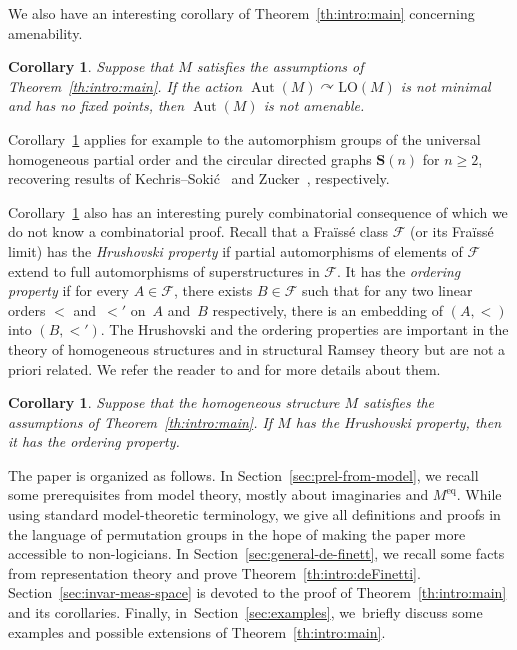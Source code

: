 \documentclass[11pt]{article}
\let\mathcal\mathscr
\let\actson\curvearrowright
\theoremstyle{plain}
\newtheorem{cor}[theorem]{Corollary}
\theoremstyle{definition}
\newcommand{\bS}{{\mathbf S}}
\newcommand{\cF}{\mathcal{F}}
\DeclareMathOperator{\Aut}{Aut}
\newcommand{\LO}{\mathrm{LO}}
\newcommand{\eq}{^{\mathrm{eq}}}
\begin{document}
We also have an interesting corollary of Theorem~\ref{th:intro:main} concerning amenability.
\begin{cor}
\label{c:intro:amenability}
Suppose that $M$ satisfies the assumptions of Theorem~\ref{th:intro:main}. If the action $\Aut(M) \actson \LO(M)$ is not minimal and has no fixed points, then $\Aut(M)$ is not amenable.
\end{cor}

Corollary~\ref{c:intro:amenability} applies for example to the automorphism groups of the universal homogeneous partial order and the circular directed graphs $\bS(n)$ for $n \geq 2$, recovering results of Kechris--Soki\'c~\cite{Kechris2012} and Zucker~\cite{Zucker2014}, respectively.

Corollary~\ref{c:intro:amenability} also has an interesting purely combinatorial consequence of which we do not know a combinatorial proof. Recall that a Fraïssé class $\cF$ (or its Fraïssé limit) has the \emph{Hrushovski property} if partial automorphisms of elements of $\cF$ extend to full automorphisms of superstructures in $\cF$. It has the \emph{ordering property} if for every $A \in \cF$, there exists $B \in \cF$ such that for any two linear orders $<$ and~$<'$ on~$A$ and~$B$ respectively, there is an embedding of $(A, <)$ into $(B, <')$. The Hrushovski and the ordering properties are important in the theory of homogeneous structures and in structural Ramsey theory but are not a priori related. We refer the reader to \cite{Kechris2007a} and \cite{Nesetril1978} for more details about them.
\begin{cor}
\label{c:intro:Hrushovski}
Suppose that the homogeneous structure $M$ satisfies the assumptions of Theorem~\ref{th:intro:main}. If $M$ has the Hrushovski property, then it has the ordering property.
\end{cor}

The paper is organized as follows. In Section~\ref{sec:prel-from-model}, we recall some prerequisites from model theory, mostly about imaginaries and $M\eq$. While using standard model-theoretic terminology, we give all definitions and proofs in the language of permutation groups in the hope of making the paper more accessible to non-logicians. In Section~\ref{sec:general-de-finett}, we recall some facts from representation theory and prove Theorem~\ref{th:intro:deFinetti}. Section~\ref{sec:invar-meas-space} is devoted to the proof of Theorem~\ref{th:intro:main} and its corollaries. Finally, in~Section~\ref{sec:examples}, we~briefly discuss some examples and possible extensions of Theorem~\ref{th:intro:main}.
\end{document}
